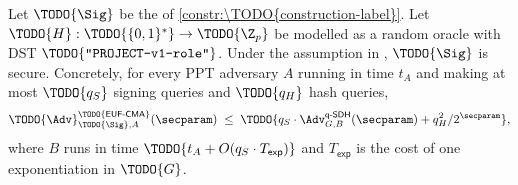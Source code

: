 %
%
%

\begin{theorem}
\label{thm:\TODO{short-label}}
Let $\TODO{\Sig}$ be the  of
\cref{constr:\TODO{construction-label}}.
Let $\TODO{H}: \TODO{\{0,1\}^*} \to \TODO{\Z_p}$ be modelled as a random oracle
with DST $\TODO{\texttt{"PROJECT-v1-role"}}$.
Under the  assumption in ,
$\TODO{\Sig}$ is  secure.
Concretely, for every PPT adversary $A$ running in time $t_A$ and making at most
$\TODO{q_S}$ signing queries and $\TODO{q_H}$ hash queries,
\[
  \TODO{\Adv}^{\TODO{\textsf{EUF-CMA}}}_{\TODO{\Sig}, A}(\secparam)
  \;\leq\;
  \TODO{q_S \cdot \Adv^{\textsf{q-SDH}}_{G, B}(\secparam) + q_H^2 / 2^\secparam},
\]
where $B$ runs in time $\TODO{t_A + O(q_S \cdot T_\textsf{exp})}$ and
$T_\textsf{exp}$ is the cost of one exponentiation in $\TODO{G}$.
\end{theorem}

